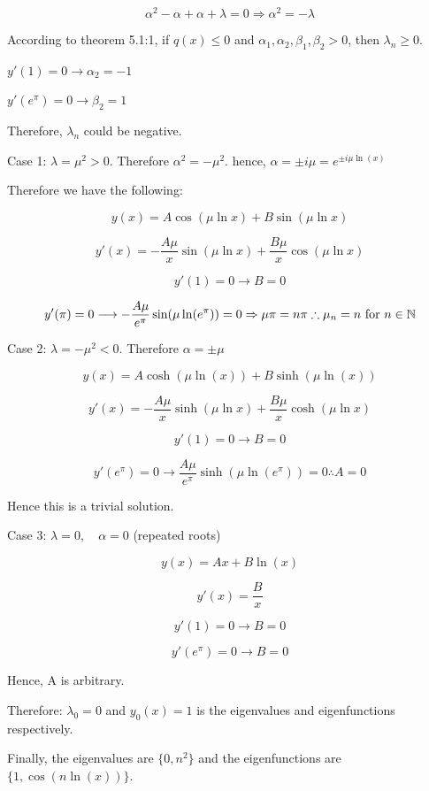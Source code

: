 \documentclass{article}
\begin{document}
$$\alpha^2 - \alpha + \alpha + \lambda = 0 \Rightarrow \alpha^2 = - \lambda$$

According to theorem 5.1:1, if $q(x) \leq 0$ and $\alpha_1, \alpha_2, \beta_1, \beta_2 > 0$, then $\lambda_n \geq 0$. 

$y'(1) = 0 \longrightarrow \alpha_2 = -1$

$y'(e^\pi) = 0 \longrightarrow \beta_2 = 1$

Therefore, $\lambda_n$ could be negative. 

\hfill

Case 1: $\lambda = \mu^2 > 0$. Therefore $\alpha^2 = - \mu^2$. hence, $\alpha = \pm i \mu = e^{\pm i \mu \ln(x)}$

Therefore we have the following:

$$y(x) = A \cos(\mu \ln x) + B \sin(\mu \ln x)$$

$$y'(x) = - \frac{A \mu}{x} \sin(\mu \ln x) + \frac{B \mu}{x} \cos(\mu \ln x)$$

$$y'(1) = 0 \longrightarrow B = 0$$

$$y'(\pi) = 0 \longrightarrow - \frac{A \mu}{e^\pi} \sin(\mu \ln(e^\pi)) = 0 \Rightarrow \mu \pi = n \pi \therefore \mu_n = n \text{ for }n \in \mathbb{N}$$

\hfill

Case 2: $\lambda = - \mu^2 < 0$. Therefore $\alpha = \pm \mu$

$$y(x) = A \cosh(\mu \ln(x)) + B \sinh (\mu \ln(x))$$

$$y'(x) = - \frac{A \mu}{x} \sinh(\mu \ln x) + \frac{B \mu}{x} \cosh(\mu \ln x)$$

$$y'(1) = 0 \longrightarrow B  =0$$

$$y'(e^\pi) = 0 \longrightarrow \frac{A \mu}{e^\pi} \sinh( \mu \ln(e^\pi)) = 0 \therefore A = 0$$

Hence this is a trivial solution. 

\hfill

Case 3: $\lambda = 0, \quad \alpha = 0$ (repeated roots)

$$y(x) = Ax + B \ln(x)$$

$$y'(x) = \frac{B}{x}$$

$$y'(1) = 0 \longrightarrow B = 0$$

$$y'(e^\pi) = 0 \longrightarrow B = 0$$

Hence, A is arbitrary. 

Therefore: $\lambda_0 = 0$ and $y_0(x) = 1$ is the eigenvalues and eigenfunctions respectively.

Finally, the eigenvalues are $\{ 0, n^2 \}$ and the eigenfunctions are $\{1, \cos(n \ln(x)) \}$. 
\end{document}
